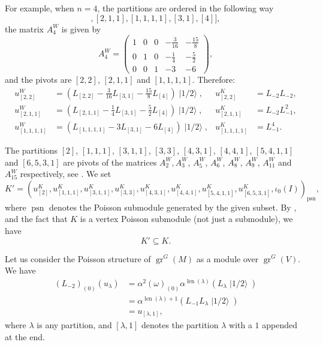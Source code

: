 \documentclass[a4paper, 12pt, reqno]{amsart}
\theoremstyle{remark}
\DeclareMathOperator{\gr}{gr}
\DeclareMathOperator{\len}{len}
\DeclareMathOperator{\psn}{psn}
\DeclareMathOperator{\vachalf}{|1/2\rangle}
\begin{document}
For example, when $n = 4$, the partitions are ordered in the following way
\begin{equation*}
  [[2, 2], [2, 1, 1], [1, 1, 1, 1], [3, 1], [4]],
\end{equation*}
the matrix $A^W_4$ is given by
\begin{equation*}
  A^W_4=
  \begin{pmatrix}
    1 & 0 & 0 & -\frac{3}{16} & -\frac{15}{8} \\
    0 & 1 & 0 & -\frac{1}{4} & -\frac{5}{2} \\
    0 & 0 & 1 & -3 & -6
  \end{pmatrix},
\end{equation*}
and the pivots are $[2, 2]$, $[2, 1, 1]$ and $[1, 1, 1, 1]$.
Therefore:
\begin{align*}
  u^W_{[2, 2]} &= (L_{[2, 2]} - \tfrac{3}{16}L_{[3, 1]} - \tfrac{15}{8}L_{[4]})\vachalf, &u^K_{[2, 2]} &= L_{-2}L_{-2}, \\
  u^W_{[2, 1, 1]} &= (L_{[2, 1, 1]} - \tfrac{1}{4}L_{[3, 1]} - \tfrac{5}{2}L_{[4]})\vachalf, &u^K_{[2, 1, 1]} &= L_{-2}L_{-1}^2, \\
  u^W_{[1, 1, 1, 1]} &= (L_{[1, 1, 1, 1]} - 3L_{[3, 1]} - 6L_{[4]})\vachalf, &u^K_{[1, 1, 1, 1]} &= L_{-1}^4.
\end{align*}

The partitions $[2]$, $[1, 1, 1]$, $[3, 1, 1]$, $[3, 3]$, $[4, 3, 1]$, $[4, 4, 1]$, $[5, 4, 1, 1]$ and $[6, 5, 3, 1]$ are pivots of the matrices $A^W_2, A^W_3$, $A^W_5$, $A^W_6$, $A^W_8$, $A^W_9$, $A^W_{11}$ and $A^W_{15}$ respectively, see \cite[ising-modules.ipynb]{sagemath2}.
We set
\begin{equation*}
  K' = (u^K_{[2]}, u^K_{[1, 1, 1]}, u^K_{[3, 1, 1]}, u^K_{[3, 3]}, u^K_{[4, 3, 1]}, u^K_{[4, 4, 1]}, u^K_{[5, 4, 1, 1]}, u^K_{[6, 5, 3, 1]}, \iota_0(I))_{\psn},
\end{equation*}
where $\psn$ denotes the Poisson submodule generated by the given subset.
By ,  and the fact that $K$ is a vertex Poisson submodule (not just a submodule), we have
\begin{equation*}
  K' \subseteq K.
\end{equation*}

Let us consider the Poisson structure of $\gr^G(M)$ as a module over $\gr^G(V)$.
We have
\begin{align*}
  (L_{-2})_{(0)}(u_{\lambda}) &= \alpha^2(\omega)_{(0)}\alpha^{\len(\lambda)}(L_{\lambda}\vachalf) \\
                              &= \alpha^{\len(\lambda) + 1}(L_{-1}L_{\lambda}\vachalf) \\
                              &= u_{[\lambda, 1]},
\end{align*}
where $\lambda$ is any partition, and $[\lambda, 1]$ denotes the partition $\lambda$ with a $1$ appended at the end.
\end{document}
